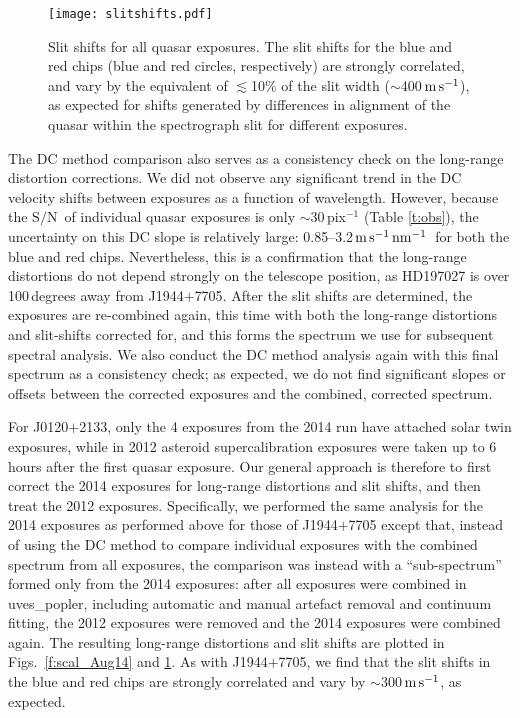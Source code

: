 \documentclass[fleqn,usenatbib,usedcolumn]{mnras}
\renewcommand{\la}{\lesssim} %
\newcommand{\Tref}[1]{Table \ref{#1}}
\newcommand{\ms}{\ensuremath{\textrm{m\,s}^{-1}}}
\newcommand{\SN}{\ensuremath{\textrm{S/N}}}
\newcommand{\msnm}{\ensuremath{\ms\,\textrm{nm}^{-1}}}
\begin{document}
\begin{figure}
\begin{center}
\texttt{[image: slitshifts.pdf]}\vspace{-1em}
\caption{Slit shifts for all quasar exposures. The slit shifts for the blue and red chips (blue and red circles, respectively) are strongly correlated, and vary by the equivalent of $\la$10\% of the slit width ($\sim$400\,\ms), as expected for shifts generated by differences in alignment of the quasar within the spectrograph slit for different exposures.}
\label{f:slit_shifts}
\end{center}
\end{figure}

The DC method comparison also serves as a consistency check on the long-range distortion corrections. We did not observe any significant trend in the DC velocity shifts between exposures as a function of wavelength. However, because the \SN\ of individual quasar exposures is only $\sim$30\,pix$^{-1}$ (\Tref{t:obs}), the uncertainty on this DC slope is relatively large: 0.85--3.2\,\msnm\ for both the blue and red chips. Nevertheless, this is a confirmation that the long-range distortions do not depend strongly on the telescope position, as HD197027 is over 100\,degrees away from J1944$+$7705. After the slit shifts are determined, the exposures are re-combined again, this time with both the long-range distortions and slit-shifts corrected for, and this forms the spectrum we use for subsequent spectral analysis. We also conduct the DC method analysis again with this final spectrum as a consistency check; as expected, we do not find significant slopes or offsets between the corrected exposures and the combined, corrected spectrum.

For J0120$+$2133, only the 4 exposures from the 2014 run have attached solar twin exposures, while in 2012 asteroid supercalibration exposures were taken up to 6 hours after the first quasar exposure. Our general approach is therefore to first correct the 2014 exposures for long-range distortions and slit shifts, and then treat the 2012 exposures. Specifically, we performed the same analysis for the 2014 exposures as performed above for those of J1944$+$7705 except that, instead of using the DC method to compare individual exposures with the combined spectrum from all exposures, the comparison was instead with a ``sub-spectrum'' formed only from the 2014 exposures: after all exposures were combined in {\sc uves\_popler}, including automatic and manual artefact removal and continuum fitting, the 2012 exposures were removed and the 2014 exposures were combined again. The resulting long-range distortions and slit shifts are plotted in Figs.\ \ref{f:scal_Aug14} and \ref{f:slit_shifts}. As with J1944$+$7705, we find that the slit shifts in the blue and red chips are strongly correlated and vary by $\sim$300\,\ms, as expected.
\end{document}
